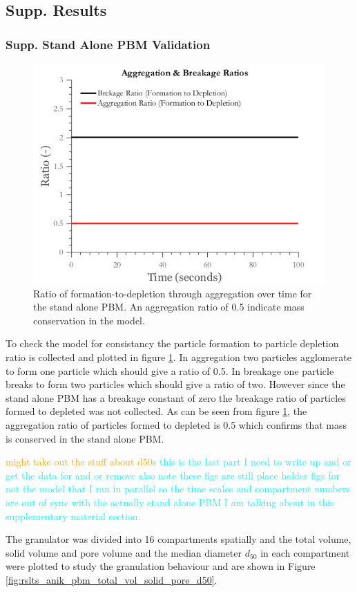 \subsection{Supp. Results}


\subsubsection{Supp. Stand Alone PBM Validation}

\begin{figure}[H]
\centering
\includegraphics[scale=0.5]{rslts_anik_pbm_ratios}
\caption{Ratio of formation-to-depletion through aggregation over time for the stand alone PBM. An aggregation ratio of 0.5 indicate mass conservation in the model.}
\label{fig:rslts_anik_pbm_ratios}
\end{figure}

\par To check the model for consistancy the particle formation to particle depletion ratio is collected and plotted in figure \ref{fig:rslts_anik_pbm_ratios}. In aggregation two particles agglomerate to form one particle which should give a ratio of 0.5. In breakage one particle breaks to form two particles which should give a ratio of two. However since the stand alone PBM has a breakage constant of zero the breakage ratio of particles formed to depleted was not collected. As can be seen from figure \ref{fig:rslts_anik_pbm_ratios}, the aggregation ratio of particles formed to depleted is 0.5 which confirms that mass is conserved in the stand alone PBM.

\textcolor{orange}{might take out the stuff about d50s}
\textcolor{cyan}{this is the last part I need to write up and or get the data for and or remove}
\textcolor{cyan}{also note these figs are still place holder figs for not the model that I ran in parallel so the time scales and compartment numbers are out of sync with the actually stand alone PBM I am talking about in this supplementary material section.}
\par The granulator was divided into 16 compartments spatially and the total volume, solid volume and pore volume and the median diameter $d_50$ in each compartment were plotted to study the granulation behaviour and are shown in Figure \ref{fig:rslts_anik_pbm_total_vol_solid_pore_d50}.


